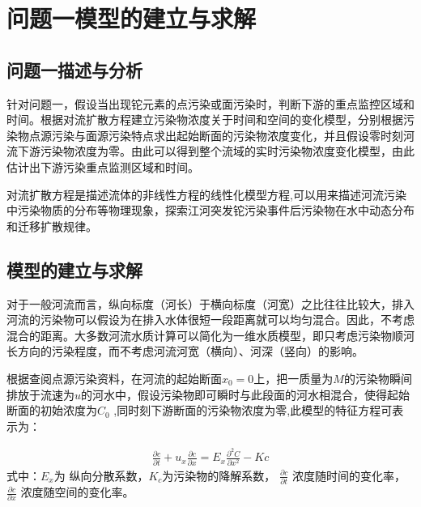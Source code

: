 \documentclass{whutmod}
\begin{document}
	
	\section{问题一模型的建立与求解}
	\subsection{问题一描述与分析}
	针对问题一，假设当出现铊元素的点污染或面污染时，判断下游的重点监控区域和时间。根据对流扩散方程建立污染物浓度关于时间和空间的变化模型，分别根据污染物点源污染与面源污染特点求出起始断面的污染物浓度变化，并且假设零时刻河流下游污染物浓度为零。由此可以得到整个流域的实时污染物浓度变化模型，由此估计出下游污染重点监测区域和时间。

	对流扩散方程是描述流体的非线性方程的线性化模型方程,可以用来描述河流污染中污染物质的分布等物理现象，探索江河突发铊污染事件后污染物在水中动态分布和迁移扩散规律。

	\subsection{模型的建立与求解}
	对于一般河流而言，纵向标度（河长）于横向标度（河宽）之比往往比较大，排入河流的污染物可以假设为在排入水体很短一段距离就可以均匀混合。因此，不考虑混合的距离。大多数河流水质计算可以简化为一维水质模型，即只考虑污染物顺河长方向的污染程度，而不考虑河流河宽（横向）、河深（竖向）的影响。

	根据查阅点源污染资料，在河流的起始断面$x_{0}=0$上，把一质量为$M$的污染物瞬间排放于流速为$u$的河水中，假设污染物即可瞬时与此段面的河水相混合，使得起始断面的初始浓度为$C_{0}$ ,同时刻下游断面的污染物浓度为零\parencite{张永祥2018龙江河镉污染分布及迁移研究},此模型的特征方程可表示为：
	
		\begin{gather}
\frac{\partial c}{\partial t}+u_{x}\frac{\partial c}{\partial x}=E_{x}\frac{\partial^{2} C}{\partial x^{2}}-Kc
\end{gather}
	式中：$E_{x}$为 纵向分散系数，$K_{c}$为污染物的降解系数，
	$\frac{\partial c}{\partial t}$ 浓度随时间的变化率，$\frac{\partial c}{\partial x}$ 浓度随空间的变化率。
	
\end{document}
